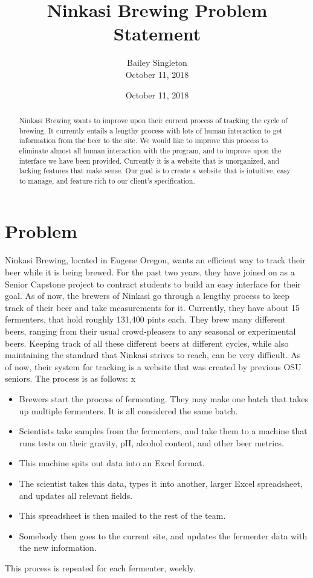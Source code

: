 \documentclass[10pt,peerreview]{IEEEtran}
\title{Ninkasi Brewing Problem Statement}
\author{Bailey Singleton \\
        October 11, 2018}
\date{October 11, 2018}
\begin{document}
\maketitle

\begin{abstract}
    Ninkasi Brewing wants to improve upon their current process of tracking the cycle of brewing. It currently entails a lengthy process with lots of human interaction to get information from the beer to the site. We would like to improve this process to eliminate almost all human interaction with the program, and to improve upon the interface we have been provided. Currently it is a website that is unorganized, and lacking features that make sense. Our goal is to create a website that is intuitive, easy to manage, and feature-rich to our client's specification.
\end{abstract}

\clearpage

\section{Problem}
    Ninkasi Brewing, located in Eugene Oregon, wants an efficient way to track their beer while it is being brewed. For the past two years, they have joined on as a Senior Capstone project to contract students to build an easy interface for their goal. As of now, the brewers of Ninkasi go through a lengthy process to keep track of their beer and take measurements for it.
    Currently, they have about 15 fermenters, that hold roughly 131,400 pints each. They brew many different beers, ranging from their usual crowd-pleasers to any seasonal or experimental beers. Keeping track of all these different beers at different cycles, while also maintaining the standard that Ninkasi strives to reach, can be very difficult. 
    As of now, their system for tracking is a website that was created by previous OSU seniors. The process is as follows: x
\begin{itemize}
    \item Brewers start the process of fermenting. They may make one batch that takes up multiple fermenters. It is all considered the same batch.
    \item Scientists take samples from the fermenters, and take them to a machine that runs tests on their gravity, pH, alcohol content, and other beer metrics.
    \item This machine spits out data into an Excel format.
    \item The scientist takes this data, types it into another, larger Excel spreadsheet, and updates all relevant fields.
    \item This spreadsheet is then mailed to the rest of the team.
    \item Somebody then goes to the current site, and updates the fermenter data with the new information.
\end{itemize}
This process is repeated for each fermenter, weekly.\\
\end{document}
